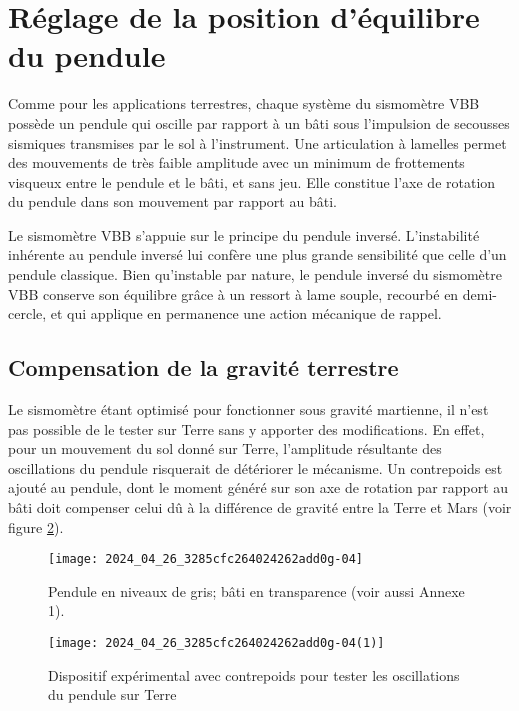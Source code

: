 
\section{Réglage de la position d'équilibre du pendule \label{ccmp2023_sec_02}}
\ifprof
\else
Comme pour les applications terrestres, chaque système du sismomètre VBB possède un pendule qui oscille par rapport à un bâti sous l'impulsion de secousses sismiques transmises par le sol à l'instrument. Une articulation à lamelles permet des mouvements de très faible amplitude avec un minimum de frottements visqueux entre le pendule et le bâti, et sans jeu. Elle constitue l'axe de rotation du pendule dans son mouvement par rapport au bâti.

Le sismomètre VBB s'appuie sur le principe du pendule inversé. L'instabilité inhérente au pendule inversé lui confère une plus grande sensibilité que celle d'un pendule classique. Bien qu'instable par nature, le pendule inversé du sismomètre VBB conserve son équilibre grâce à un ressort à lame souple, recourbé en demi-cercle, et qui applique en permanence une action mécanique de rappel.
\fi

\subsection{Compensation de la gravité terrestre \label{ccmp2023_sec_02_01}}
\ifprof
\else
Le sismomètre étant optimisé pour fonctionner sous gravité martienne, il n'est pas possible de le tester sur Terre sans y apporter des modifications. En effet, pour un mouvement du sol donné sur Terre, l'amplitude résultante des oscillations du pendule risquerait de détériorer le mécanisme. Un contrepoids est ajouté au pendule, dont le moment généré sur son axe de rotation par rapport au bâti doit compenser celui dû à la différence de gravité entre la Terre et Mars (voir figure \ref{ccmp2023_fig_03b}).



\begin{figure*}[h!]
    \centering
    \begin{subfigure}[t]{0.45\textwidth}
        \centering
        \texttt{[image: 2024\_04\_26\_3285cfc264024262add0g-04]}
        \caption{\label{ccmp2023_fig_03a} Pendule en niveaux de gris; bâti en transparence (voir aussi Annexe 1).}
    \end{subfigure}%
    \hfill
    \begin{subfigure}[t]{0.45\textwidth}
        \centering
        \texttt{[image: 2024\_04\_26\_3285cfc264024262add0g-04(1)]}
        \caption{\label{ccmp2023_fig_03b} Dispositif expérimental avec contrepoids pour tester les oscillations du pendule sur Terre}
    \end{subfigure}
    \caption{}
\end{figure*}
\fi


